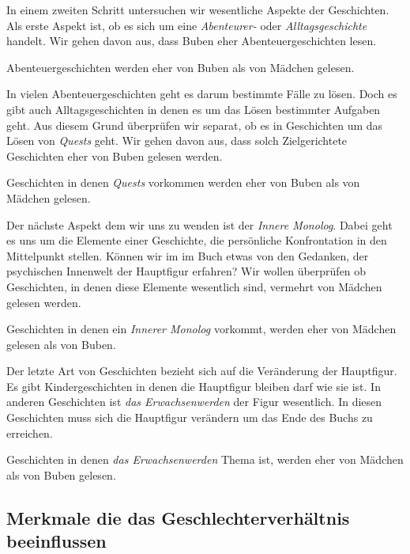 In einem zweiten Schritt untersuchen wir wesentliche Aspekte der
Geschichten. Als erste Aspekt ist, ob es sich um eine \emph{Abenteurer-}
oder \emph{Alltagsgeschichte} handelt. Wir gehen davon aus, dass Buben
eher Abenteuergeschichten lesen.

\begin{subhyp}
   Abenteuergeschichten werden eher von Buben als von Mädchen gelesen.
\end{subhyp}

In vielen Abenteuergeschichten geht es darum bestimmte Fälle zu lösen.
Doch es gibt auch Alltagsgeschichten in denen es um das Lösen bestimmter
Aufgaben geht. Aus diesem Grund überprüfen wir separat, ob es in
Geschichten um das Lösen von \emph{Quests} geht. Wir gehen davon aus,
dass solch Zielgerichtete Geschichten eher von Buben gelesen werden.

\begin{subhyp}
    Geschichten in denen \emph{Quests} vorkommen werden eher von Buben als von Mädchen gelesen.
\end{subhyp}

Der nächste Aspekt dem wir uns zu wenden ist der \emph{Innere Monolog}.
Dabei geht es uns um die Elemente einer Geschichte, die persönliche
Konfrontation in den Mittelpunkt stellen. Können wir im im Buch etwas
von den Gedanken, der psychischen Innenwelt der Hauptfigur erfahren? Wir
wollen überprüfen ob Geschichten, in denen diese Elemente wesentlich
sind, vermehrt von Mädchen gelesen werden.

\begin{subhyp}
   Geschichten in denen ein \emph{Innerer Monolog} vorkommt, werden eher von Mädchen gelesen als von Buben.
\end{subhyp}

Der letzte Art von Geschichten bezieht sich auf die Veränderung der
Hauptfigur. Es gibt Kindergeschichten in denen die Hauptfigur bleiben
darf wie sie ist. In anderen Geschichten ist \emph{das Erwachsenwerden}
der Figur wesentlich. In diesen Geschichten muss sich die Hauptfigur
verändern um das Ende des Buchs zu erreichen.

\begin{subhyp}
   Geschichten in denen \emph{das Erwachsenwerden} Thema ist,
   werden eher von Mädchen als von Buben gelesen.
\end{subhyp}

\subsection{Merkmale die das Geschlechterverhältnis beeinflussen}

